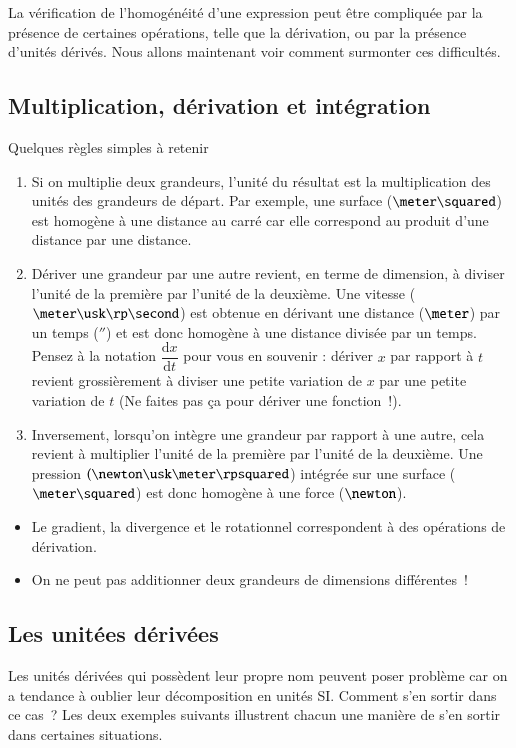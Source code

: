 \documentclass[12pt]{book}
\begin{document}
La vérification de l'homogénéité d'une expression peut être compliquée par la présence de certaines opérations,
telle que la dérivation, ou par la présence d'unités dérivés. Nous allons maintenant voir comment surmonter 
ces difficultés.
\subsection{Multiplication, dérivation et intégration}
Quelques règles simples à retenir

\begin{enumerate}
	\item Si on multiplie deux grandeurs, l'unité du résultat est 
	  la multiplication des unités des grandeurs de départ. Par exemple,
	  une surface ($\meter \squared$)
	  est homogène  à une distance au carré car elle correspond
	  au produit d'une distance par une distance.
	\item Dériver une grandeur par une autre revient, en terme de dimension,
		à diviser l'unité de la première par l'unité de la deuxième. Une vitesse ($\meter \usk \rp \second$)
		est obtenue en dérivant une distance ($\meter$) par un temps ($\second$) 
		et est donc homogène à une distance
	  divisée par un temps. Pensez à la notation 
	  $\dfrac{\mathrm{d}x}{\mathrm{d}t}$ pour vous en souvenir : dériver
	  $x$ par rapport à $t$ revient grossièrement à diviser une petite variation de $x$
	  par une petite variation de $t$ (Ne faites pas ça pour dériver une fonction~!).
	\item Inversement, lorsqu'on intègre une grandeur par rapport à une autre, cela
	  revient à multiplier l'unité de la première par l'unité de la deuxième.
	  Une pression $(\newton \usk \meter \rpsquared$) intégrée sur une surface ($\meter \squared$) 
	  est donc homogène à une force ($\newton$).
\end{enumerate}

\begin{rema}
\begin{itemize}
	\item Le gradient, la divergence et le rotationnel correspondent à des 
	opérations de dérivation.
	\item On ne peut pas additionner deux grandeurs de dimensions 
	  différentes~!
\end{itemize}
\end{rema}
\subsection{Les unitées dérivées}
Les unités dérivées qui possèdent leur propre nom peuvent poser problème car 
on a tendance à oublier leur décomposition en unités SI.
Comment s'en sortir dans ce cas~? Les deux exemples
suivants illustrent chacun une manière de s’en sortir dans certaines
situations. 
\end{document}
